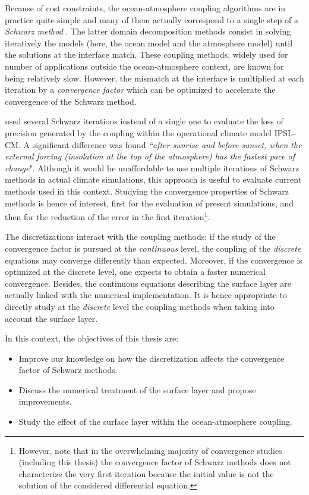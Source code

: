 \par %
Because of cost constraints, the ocean-atmosphere coupling algorithms
are in practice quite simple and many of them actually
correspond to a single step of a \textit{Schwarz method}
\citep{lemarie_analysis_2015}. 
The latter domain decomposition methods consist in solving
iteratively the models (here, the ocean model and the
atmosphere model) until the solutions at the interface match.
These coupling methods, widely used for number of applications
outside the ocean-atmosphere context, are known for being relatively
slow. However, the mismatch at the interface is multiplied
at each iteration by a \textit{convergence factor} which
can be optimized to accelerate the convergence of the
Schwarz method.
\par %
\citep{marti_schwarz_2021} used several Schwarz iterations
instead of a single one to evaluate the loss of precision
generated by the coupling within the operational climate model
IPSL-CM. A significant difference was found
\textit{``after sunrise
and before sunset, when the external forcing (insolation at
the top of the atmosphere) has the fastest pace of change}".
Although it would be unaffordable to use multiple
iterations of Schwarz methods in actual climate simulations,
this approach is useful to evaluate current methods
used in this context.
Studying the convergence properties of Schwarz methods is
hence of interest, first for the evaluation of present simulations,
and then for the reduction of the
error in the first iteration\footnote{However, note that
in the overwhelming majority of convergence studies
(including this thesis) the convergence factor of
Schwarz methods does not characterize the very first iteration
because the initial value is not the solution of the
considered differential equation.}.
\par %
The discretizations interact with the coupling methods:
if the study of the convergence factor is pursued at the
\textit{continuous} level, the coupling of the \textit{discrete}
equations may converge differently than expected. Moreover,
if the convergence is optimized at the discrete level, one expects
to obtain a faster numerical convergence.
Besides, the continuous equations describing the surface
layer are actually linked with the numerical implementation.
It is hence appropriate to directly study at the \textit{discrete}
level the coupling methods when taking into account
the surface layer.
\par %
In this context, the objectives of this thesis are:
\begin{itemize}
\item Improve our knowledge on how the discretization affects
the convergence factor of Schwarz methods.
\item Discuss the numerical treatment of the surface layer and propose
	improvements.
\item Study the effect of the surface layer within
	the ocean-atmosphere coupling.
\end{itemize}
